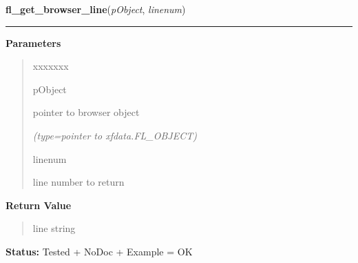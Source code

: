\hspace{.8\funcindent}\begin{boxedminipage}{\funcwidth}

    \raggedright \textbf{fl\_get\_browser\_line}(\textit{pObject}, \textit{linenum})

    \vspace{-1.5ex}

    \rule{\textwidth}{0.5\fboxrule}
\setlength{\parskip}{2ex}
\setlength{\parskip}{1ex}
      \textbf{Parameters}
      \vspace{-1ex}

      \begin{quote}
        \begin{Ventry}{xxxxxxx}

          \item[pObject]

          pointer to browser object

            {\it (type=pointer to xfdata.FL\_OBJECT)}

          \item[linenum]

          line number to return

        \end{Ventry}

      \end{quote}

      \textbf{Return Value}
    \vspace{-1ex}

      \begin{quote}
      line string

      \end{quote}

\textbf{Status:} Tested + NoDoc + Example = OK



    \end{boxedminipage}

    \label{xformslib:library:fl_load_browser}

    \vspace{0.5ex}

